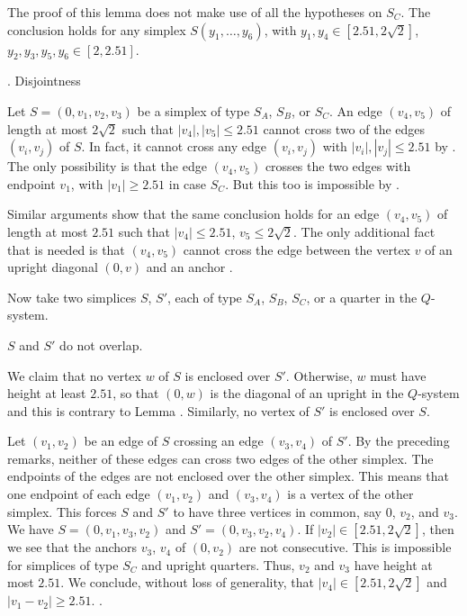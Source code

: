   The proof of 
this lemma does not make use of all the
hypotheses on $S_C$.  The conclusion holds for any
simplex $S(y_1,\ldots,y_6)$,
with $y_1,y_4\in[2.51,2\sqrt{2}]$, $y_2,y_3,y_5,y_6\in[2,2.51]$.
\endproclaim

\subhead {}. Disjointness \endsubhead

Let $S=(0,v_1,v_2,v_3)$ be a simplex of type $S_A$, $S_B$, or $S_C$. 
An edge $(v_4,v_5)$
of length at most $2\sqrt{2}$ such that $|v_4|,|v_5|\le 2.51$
cannot cross two of the edges $(v_i,v_j)$ of $S$.  In fact,
it cannot cross any edge $(v_i,v_j)$ with $|v_i|,|v_j|\le 2.51$
by \cite{F.1.6}.  The only possibility is that the edge $(v_4,v_5)$
crosses the two edges with endpoint $v_1$, with $|v_1|\ge2.51$
in case $S_C$.  But this too is impossible by \cite{F.1.8}.

Similar arguments show that the same conclusion holds 
for an edge $(v_4,v_5)$ of length at most $2.51$ such that
$|v_4|\le2.51$, $v_5\le2\sqrt{2}$.  The only additional fact that
is needed is that $(v_4,v_5)$ cannot cross the edge between
the vertex $v$ of an upright diagonal $(0,v)$ and an anchor \cite{F.1.3}.

Now take two simplices $S$, $S'$, each of  type $S_A$, $S_B$, $S_C$,
 or a quarter in the $Q$-system.


 $S$ and $S'$ do not overlap.
\endproclaim

  We claim that no vertex $w$ of $S$ is enclosed over $S'$.
Otherwise, $w$ must have height at least $2.51$, so that 
$(0,w)$ is the diagonal of an
upright in the $Q$-system and this is contrary to Lemma
.
Similarly, no vertex of $S'$ is enclosed over $S$.

Let $(v_1,v_2)$ be an edge of $S$ crossing an edge
$(v_3,v_4)$ of $S'$.  By the preceding remarks, 
neither of these edges can cross two edges of the other simplex.
The endpoints of the edges are not enclosed over the other simplex.
This means that one endpoint of each edge $(v_1,v_2)$ and $(v_3,v_4)$
is a vertex of the other simplex.  This forces $S$ and $S'$ to have three
vertices in common, say $0$, $v_2$, and $v_3$.  We have
$S=(0,v_1,v_3,v_2)$ and $S'=(0,v_3,v_2,v_4)$.  
If $|v_2|\in[2.51,2\sqrt{2}]$, then we see that the anchors $v_3$, $v_4$
of $(0,v_2)$ are not consecutive.  This is impossible for simplices
of type $S_C$ and upright quarters.  Thus, $v_2$ and $v_3$ have height
at most $2.51$.  We conclude, without loss of generality, 
that $|v_4|\in[2.51,2\sqrt{2}]$ and $|v_1-v_2|\ge 2.51$. \cite{F.1}.

